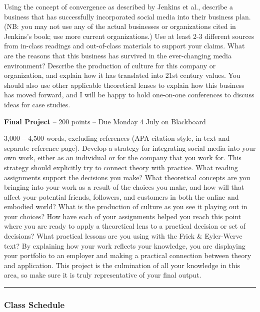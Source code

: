 \documentclass[]{tufte-handout}
\begin{document}
Using the concept of convergence as described by Jenkins et al.,
describe a business that has successfully incorporated social media into
their business plan. (NB: you may not use any of the actual businesses
or organizations cited in Jenkins's book; use more current
organizations.) Use at least 2-3 different sources from in-class
readings and out-of-class materials to support your claims. What are the
reasons that this business has survived in the ever-changing media
environment? Describe the production of culture for this company or
organization, and explain how it has translated into 21st century
values. You should also use other applicable theoretical lenses to
explain how this business has moved forward, and I will be happy to hold
one-on-one conferences to discuss ideas for case studies.

\textbf{Final Project} -- 200 points -- Due Monday 4 July on Blackboard

3,000 -- 4,500 words, excluding references (APA citation style, in-text
and separate reference page). Develop a strategy for integrating social
media into your own work, either as an individual or for the company
that you work for. This strategy should explicitly try to connect theory
with practice. What reading assignments support the decisions you make?
What theoretical concepts are you bringing into your work as a result of
the choices you make, and how will that affect your potential friends,
followers, and customers in both the online and embodied world? What is
the production of culture as you see it playing out in your choices? How
have each of your assignments helped you reach this point where you are
ready to apply a theoretical lens to a practical decision or set of
decisions? What practical lessons are you using with the Frick \&
Eyler-Werve text? By explaining how your work reflects your knowledge,
you are displaying your portfolio to an employer and making a practical
connection between theory and application. This project is the
culmination of all your knowledge in this area, so make sure it is truly
representative of your final output.

\begin{center}\rule{0.5\linewidth}{0.5pt}\end{center}

\hypertarget{class-schedule}{%
\subsubsection{Class Schedule}\label{class-schedule}}
\end{document}
